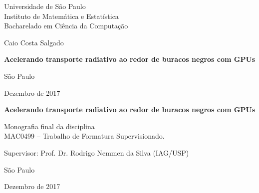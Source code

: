 \documentclass[12pt,twoside,a4paper]{book}
\begin{document}
\frontmatter
\fancyhead[RO]{{\footnotesize\rightmark}\hspace{2em}\thepage}
\setcounter{tocdepth}{2}
\fancyhead[LE]{\thepage\hspace{2em}\footnotesize{\leftmark}}
\fancyhead[RE,LO]{}
\fancyhead[RO]{{\footnotesize\rightmark}\hspace{2em}\thepage}

\onehalfspacing  %

\thispagestyle{empty}
\begin{center}
    \vspace*{2.3cm}
    Universidade de São Paulo\\
    Instituto de Matemática e Estatística\\
    Bacharelado em Ciência da Computação


    \vspace*{3cm}
    \Large{Caio Costa Salgado}


    \vspace{3cm}
    \textbf{\Large{Acelerando transporte radiativo ao redor de buracos negros com GPUs}}


    \vskip 5cm
    \normalsize{São Paulo}

    \normalsize{Dezembro de 2017}
\end{center}

%
\newpage
\thispagestyle{empty}
  \begin{center}
    \vspace*{2.3 cm}
    \textbf{\Large{Acelerando transporte radiativo ao redor de buracos negros com GPUs}}
    \vspace*{2 cm}
  \end{center}

  \vskip 2cm

  \begin{flushright}
    Monografia final da disciplina \\
    MAC0499 -- Trabalho de Formatura Supervisionado.
  \end{flushright}

  \vskip 5cm

  \begin{center}
    Supervisor: Prof. Dr. Rodrigo Nemmen da Silva (IAG/USP)

    \vskip 5cm
    \normalsize{São Paulo}

    \normalsize{Dezembro de 2017}
  \end{center}
\pagebreak
\end{document}
